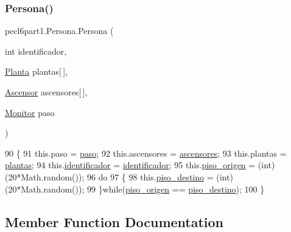 \subsubsection{\texorpdfstring{Persona()}{Persona()}}
{\footnotesize\ttfamily pecl6part1.\+Persona.\+Persona (\begin{DoxyParamCaption}\item[{int}]{identificador,  }\item[{\mbox{\hyperlink{classpecl6part1_1_1_planta}{Planta}}}]{plantas\mbox{[}$\,$\mbox{]},  }\item[{\mbox{\hyperlink{classpecl6part1_1_1_ascensor}{Ascensor}}}]{ascensores\mbox{[}$\,$\mbox{]},  }\item[{\mbox{\hyperlink{classpecl6part1_1_1_monitor}{Monitor}}}]{paso }\end{DoxyParamCaption})\hspace{0.3cm}{\ttfamily [inline]}}


\begin{DoxyCode}
90     \{
91         this.paso = \mbox{\hyperlink{classpecl6part1_1_1_persona_a5bad8cf9009a1412b98f0585761ba19a}{paso}};
92         this.ascensores = \mbox{\hyperlink{classpecl6part1_1_1_persona_a4a61953407b3ad73a3dfcc9314f36d73}{ascensores}};
93         this.plantas = \mbox{\hyperlink{classpecl6part1_1_1_persona_aa5841c74449c09b7aa8e0c646365228d}{plantas}};
94         this.\mbox{\hyperlink{classpecl6part1_1_1_persona_a21697d6304f8709b939317b63daccdcc}{identificador}} = \mbox{\hyperlink{classpecl6part1_1_1_persona_a21697d6304f8709b939317b63daccdcc}{identificador}};
95         this.\mbox{\hyperlink{classpecl6part1_1_1_persona_a6a8187e7b1c423eb263a336a573d634f}{piso\_origen}} = (int) (20*Math.random());
96         \textcolor{keywordflow}{do}
97         \{
98             this.\mbox{\hyperlink{classpecl6part1_1_1_persona_a2601b87adc4d07c03478b8a5dec4289e}{piso\_destino}} = (int) (20*Math.random());
99         \}\textcolor{keywordflow}{while}(\mbox{\hyperlink{classpecl6part1_1_1_persona_a6a8187e7b1c423eb263a336a573d634f}{piso\_origen}} == \mbox{\hyperlink{classpecl6part1_1_1_persona_a2601b87adc4d07c03478b8a5dec4289e}{piso\_destino}});
100     \}
\end{DoxyCode}


\subsection{Member Function Documentation}
\mbox{\label{classpecl6part1_1_1_persona_a1ee95a7bcb4b3cfe808d39c6db8dcc06}} 
